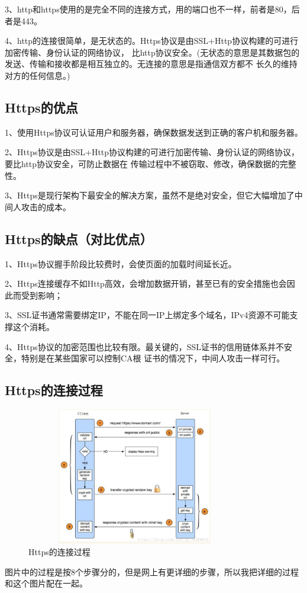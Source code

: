 \documentclass[UTF8]{ctexart}
\begin{document}
3、http和https使用的是完全不同的连接方式，用的端口也不一样，前者是80，后者是443。

4、http的连接很简单，是无状态的。Https协议是由SSL+Http协议构建的可进行加密传输、身份认证的网络协议，
比http协议安全。(无状态的意思是其数据包的发送、传输和接收都是相互独立的。无连接的意思是指通信双方都不
	长久的维持对方的任何信息。)
\subsection{Https的优点}
1、使用Https协议可认证用户和服务器，确保数据发送到正确的客户机和服务器。

2、Https协议是由SSL+Http协议构建的可进行加密传输、身份认证的网络协议，要比http协议安全，可防止数据在
传输过程中不被窃取、修改，确保数据的完整性。

3、Https是现行架构下最安全的解决方案，虽然不是绝对安全，但它大幅增加了中间人攻击的成本。
\subsection{Https的缺点（对比优点）}
1、Https协议握手阶段比较费时，会使页面的加载时间延长近。

2、Https连接缓存不如Http高效，会增加数据开销，甚至已有的安全措施也会因此而受到影响；

3、SSL证书通常需要绑定IP，不能在同一IP上绑定多个域名，IPv4资源不可能支撑这个消耗。

4、Https协议的加密范围也比较有限。最关键的，SSL证书的信用链体系并不安全，特别是在某些国家可以控制CA根
证书的情况下，中间人攻击一样可行。
\subsection{Https的连接过程}
\begin{figure}[htbp]
\centering
\includegraphics[height=6.0cm,width=9.5cm]{Figure/20180709141944471.jpg}
\caption{Https的连接过程}
\end{figure}
图片中的过程是按8个步骤分的，但是网上有更详细的步骤，所以我把详细的过程和这个图片配在一起。
\end{document}
